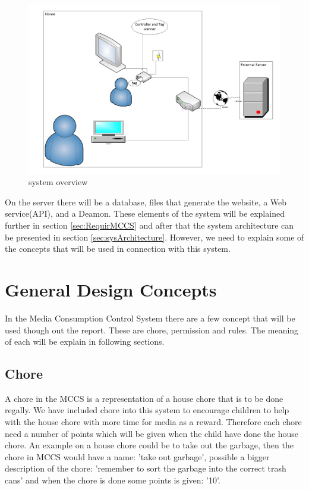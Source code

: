 \begin{figure}
	\centering
		\includegraphics[width=1.00\textwidth]{images/systemoverview.jpg}
	\caption{system overview}
	\label{fig:systemoverview}
\end{figure}

On the server there will be a database, files that generate the website, a Web service(API), and a Deamon. These elements of the system will be explained further in section \vref{sec:RequirMCCS} and after that the system architecture can be presented in section \vref{sec:sysArchitecture}. However, we need to explain some of the concepts that will be used in connection with this system.

\section{General Design Concepts}
In the Media Consumption Control System there are a few concept that will be used though out the report. These are chore, permission and rules. The meaning of each will be explain in following sections.

\subsection{Chore}
A chore in the MCCS is a representation of a house chore that is to be done regally. We have included chore into this system to encourage children to help with the house chore with more time for media as a reward. Therefore each chore need a number of points which will be given when the child have done the house chore. 
An example on a house chore could be to take out the garbage, then the chore in MCCS would have a name: 'take out garbage', possible a bigger description of the chore: 'remember to sort the garbage into the correct trash cans' and when the chore is done some points is given: '10'.  

